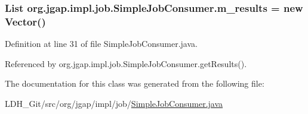 \hypertarget{classorg_1_1jgap_1_1impl_1_1job_1_1_simple_job_consumer_ace0170224c8d4aac738b5c737bd5e119}{
\subsubsection[{m\-\_\-results}]{\setlength{\rightskip}{0pt plus 5cm}List org.\-jgap.\-impl.\-job.\-Simple\-Job\-Consumer.\-m\-\_\-results = new Vector()\hspace{0.3cm}{\ttfamily [private]}}}\label{classorg_1_1jgap_1_1impl_1_1job_1_1_simple_job_consumer_ace0170224c8d4aac738b5c737bd5e119}


Definition at line 31 of file Simple\-Job\-Consumer.\-java.



Referenced by org.\-jgap.\-impl.\-job.\-Simple\-Job\-Consumer.\-get\-Results().



The documentation for this class was generated from the following file\-:\begin{DoxyCompactItemize}
\item 
L\-D\-H\-\_\-\-Git/src/org/jgap/impl/job/\hyperlink{_simple_job_consumer_8java}{Simple\-Job\-Consumer.\-java}\end{DoxyCompactItemize}
